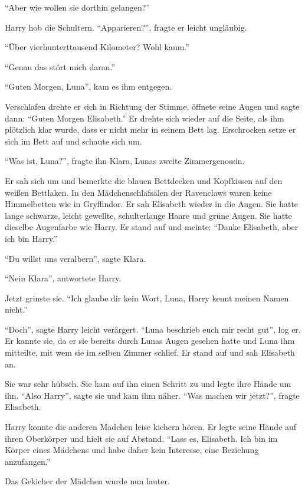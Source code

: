 \enquote{Aber wie wollen sie dorthin gelangen?}

Harry hob die Schultern. \enquote{Apparieren?}, fragte er leicht ungläubig.

\enquote{Über vierhunterttausend Kilometer? Wohl kaum.}

\enquote{Genau das stört mich daran.}

\trenn

\enquote{Guten Morgen, Luna}, kam es ihm entgegen.

Verschlafen drehte er sich in Richtung der Stimme, öffnete seine Augen und sagte dann: \enquote{Guten Morgen Elisabeth.} Er drehte sich wieder auf die Seite, als ihm plötzlich klar wurde, dass er nicht mehr in seinem Bett lag. Erschrocken setze er sich im Bett auf und schaute sich um.

\enquote{Was ist, Luna?}, fragte ihn Klara, Lunas zweite Zimmergenossin.

Er sah sich um und bemerkte die blauen Bettdecken und Kopfkissen auf den weißen Bettlaken. In den Mädchenschlafsälen der Ravenclaws waren keine Himmelbetten wie in Gryffindor. Er sah Elisabeth wieder in die Augen. Sie hatte lange schwarze, leicht gewellte, schulterlange Haare und grüne Augen. Sie hatte dieselbe Augenfarbe wie Harry. Er stand auf und meinte: \enquote{Danke Elisabeth, aber ich bin Harry.}

\enquote{Du willst uns veralbern}, sagte Klara.

\enquote{Nein Klara}, antwortete Harry.

Jetzt grinste sie. \enquote{Ich glaube dir kein Wort, Luna, Harry kennt meinen Namen nicht.}

\enquote{Doch}, sagte Harry leicht verärgert. \enquote{Luna beschrieb euch mir recht gut}, log er. Er kannte sie, da er sie bereits durch Lunas Augen gesehen hatte und Luna ihm mitteilte, mit wem sie im selben Zimmer schlief. Er stand auf und sah Elisabeth an.

Sie war sehr hübsch. Sie kam auf ihn einen Schritt zu und legte ihre Hände um ihn. \enquote{Also Harry}, sagte sie und kam ihm näher. \enquote{Was machen wir jetzt?}, fragte Elisabeth.

Harry konnte die anderen Mädchen leise kichern hören. Er legte seine Hände auf ihren Oberkörper und hielt sie auf Abstand. \enquote{Lass es, Elisabeth. Ich bin im Körper eines Mädchens und habe daher kein Interesse, eine Beziehung anzufangen.}

Das Gekicher der Mädchen wurde nun lauter.

